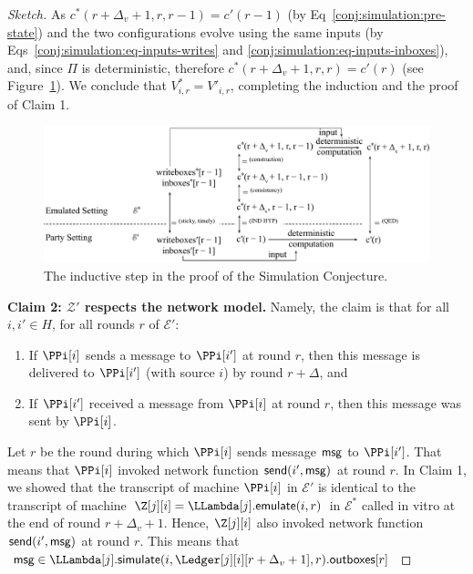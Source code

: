 \begin{proof}[Sketch]
  As $c^*(r + \Delta_v + 1, r, r - 1) = c'(r - 1)$ (by Eq~\ref{conj:simulation:pre-state})
  and the two configurations evolve using the same inputs (by
  Eqs~\ref{conj:simulation:eq-inputs-writes} and \ref{conj:simulation:eq-inputs-inboxes}),
  and, since $\Pi$ is deterministic,
  therefore $c^*(r + \Delta_v + 1, r, r) = c'(r)$ (see Figure~\ref{fig.emulation-claim-1-induction}).
  We conclude that $V^*_{i,r} = V'_{i,r}$, completing the induction
  and the proof of Claim 1.

  \begin{figure}
    \centering
    \includegraphics[width=\textwidth,keepaspectratio]{figures/emulation-claim-1-induction.pdf}
    \caption{The inductive step in the proof of the Simulation Conjecture.}
    \label{fig.emulation-claim-1-induction}
  \end{figure}

  \noindent
  \textbf{Claim 2: $\mathcal{Z}'$ respects the network model.}
  Namely, the claim is that for all $i, i' \in H$, for all rounds $r$ of $\mathcal{E}'$:

  \begin{enumerate}[label=(\alph*)]
    \item
    \label{conj:simulation:claim-delta}
    If $\PPi[i]$ sends a message to $\PPi[i']$ at round $r$, then this message is delivered to $\PPi[i']$ (with source $i$) by round $r + \Delta$, and

    \item
    If $\PPi[i']$ received a message from $\PPi[i]$ at round $r$, then this message was sent by $\PPi[i]$.
  \end{enumerate}

  Let $r$ be the round during which $\PPi[i]$ sends message $\textsf{msg}$ to $\PPi[i']$.
  That means that $\PPi[i]$ invoked network function $\textsf{send}(i', \textsf{msg})$ at round $r$.
  In Claim 1, we showed that the transcript of machine $\PPi[i]$ in $\mathcal{E}'$
  is identical to the transcript of machine $\Z[j][i] = \LLambda[j].\emulateMachine(i,r)$ in $\mathcal{E}^*$
  called in vitro at the end of round $r + \Delta_v + 1$.
  Hence, $\Z[j][i]$ also invoked network function $\textsf{send}(i', \textsf{msg})$ at round $r$.
  This means that $\msg \in \LLambda[j].\simulate(i, \Ledger[j][i][r + \Delta_v + 1], r).\outboxes[r]$



\end{proof}
